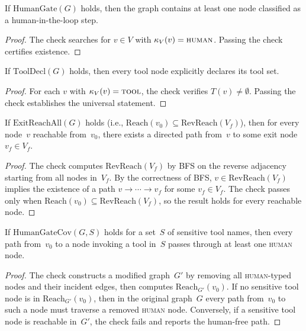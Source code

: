 \begin{lemma}
\label{lem:human_gate}
If $\mathrm{HumanGate}(G)$ holds, then the graph contains at least one
node classified as a human-in-the-loop step.
\end{lemma}
\begin{proof}
The check searches for $v \in V$ with $\kappa_V(v) = \textsc{human}$.
Passing the check certifies existence.
\end{proof}

\begin{lemma}
\label{lem:tool_decl}
If $\mathrm{ToolDecl}(G)$ holds, then every tool node explicitly
declares its tool set.
\end{lemma}
\begin{proof}
For each $v$ with $\kappa_V(v) = \textsc{tool}$, the check verifies
$T(v) \neq \emptyset$. Passing the check establishes the universal
statement.
\end{proof}

\begin{lemma}
\label{lem:reverse_reach}
If $\mathrm{ExitReachAll}(G)$ holds (i.e.,
$\mathrm{Reach}(v_0) \subseteq \mathrm{RevReach}(V_f)$), then for every
node~$v$ reachable from~$v_0$, there exists a directed path from~$v$ to
some exit node~$v_f \in V_f$.
\end{lemma}
\begin{proof}
The check computes $\mathrm{RevReach}(V_f)$ by BFS on the reverse
adjacency starting from all nodes in~$V_f$. By the correctness of BFS,
$v \in \mathrm{RevReach}(V_f)$ implies the existence of a path
$v \to \cdots \to v_f$ for some $v_f \in V_f$. The check passes only when
$\mathrm{Reach}(v_0) \subseteq \mathrm{RevReach}(V_f)$, so the result
holds for every reachable node.
\end{proof}

\begin{lemma}
\label{lem:human_gate_cov}
If $\mathrm{HumanGateCov}(G, S)$ holds for a set~$S$ of sensitive tool
names, then every path from~$v_0$ to a node invoking a tool in~$S$
passes through at least one \textsc{human} node.
\end{lemma}
\begin{proof}
The check constructs a modified graph~$G'$ by removing all
\textsc{human}-typed nodes and their incident edges, then computes
$\mathrm{Reach}_{G'}(v_0)$.  If no sensitive tool node is in
$\mathrm{Reach}_{G'}(v_0)$, then in the original graph~$G$ every path
from~$v_0$ to such a node must traverse a removed \textsc{human} node.
Conversely, if a sensitive tool node is reachable in~$G'$, the
check fails and reports the human-free path.
\end{proof}

